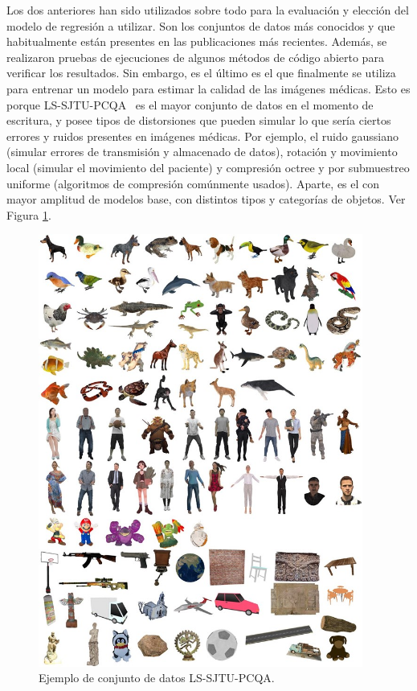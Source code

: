 Los dos anteriores han sido utilizados sobre todo para la evaluación y elección 
del modelo de regresión a utilizar. Son los conjuntos de datos más conocidos 
y que habitualmente están presentes en las publicaciones más recientes. Además, se realizaron 
pruebas de ejecuciones de algunos métodos de código abierto para verificar los 
resultados. Sin embargo, es el último es el que finalmente se utiliza para entrenar un modelo para estimar 
la calidad de las imágenes médicas. Esto es porque LS-SJTU-PCQA~\cite{ResSCNN} 
es el mayor conjunto de datos 
en el momento de escritura, y posee tipos de distorsiones que pueden simular 
lo que sería ciertos errores y ruidos presentes en imágenes médicas. Por ejemplo, 
el ruido gaussiano (simular errores de transmisión y almacenado de datos), 
rotación y movimiento local (simular el movimiento del paciente) y compresión 
octree y por submuestreo uniforme (algoritmos de compresión comúnmente usados).
Aparte, es el con mayor amplitud de modelos base, con distintos tipos y categorías 
de objetos. Ver Figura \ref{fig:LS-SJTU-PCQA}.

\begin{figure}[htp]
  \begin{center}
    \includegraphics[width=0.95\textwidth]{imagenes/chapter4/LSPCQA}
  \end{center}
  \caption{Ejemplo de conjunto de datos LS-SJTU-PCQA.}
  \label{fig:LS-SJTU-PCQA}
\end{figure}

